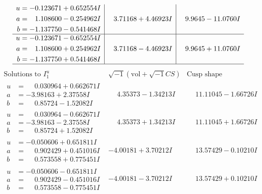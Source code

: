 \documentclass[1p]{elsarticle_modified}
\theoremstyle{definition}
\newcommand{\I}{\sqrt{-1}}
\begin{document}
$$\begin{array}{c|c|c}
\begin{aligned}
u &= -0.123671 + 0.652554 I \\
a &= \phantom{-}1.108600 - 0.254962 I \\
b &= -1.137750 - 0.541468 I\end{aligned}
 & \phantom{-}3.71168 + 4.46923 I & \phantom{-}9.9645 - 11.0760 I \\ \hline\begin{aligned}
u &= -0.123671 - 0.652554 I \\
a &= \phantom{-}1.108600 + 0.254962 I \\
b &= -1.137750 + 0.541468 I\end{aligned}
 & \phantom{-}3.71168 - 4.46923 I & \phantom{-}9.9645 + 11.0760 I\\
 \hline 
 \end{array}$$\newpage$$\begin{array}{c|c|c}  
\text{Solutions to }I^u_{1}& \I (\text{vol} + \sqrt{-1}CS) & \text{Cusp shape}\\
 \hline 
\begin{aligned}
u &= \phantom{-}0.030964 + 0.662671 I \\
a &= -3.98163 + 2.37558 I \\
b &= \phantom{-}0.85724 - 1.52082 I\end{aligned}
 & \phantom{-}4.35373 - 1.34213 I & \phantom{-}11.11045 - 1.66726 I \\ \hline\begin{aligned}
u &= \phantom{-}0.030964 - 0.662671 I \\
a &= -3.98163 - 2.37558 I \\
b &= \phantom{-}0.85724 + 1.52082 I\end{aligned}
 & \phantom{-}4.35373 + 1.34213 I & \phantom{-}11.11045 + 1.66726 I \\ \hline\begin{aligned}
u &= -0.050606 + 0.651811 I \\
a &= \phantom{-}0.902429 + 0.451016 I \\
b &= \phantom{-}0.573558 + 0.775451 I\end{aligned}
 & -4.00181 + 3.70212 I & \phantom{-}13.57429 - 0.10210 I \\ \hline\begin{aligned}
u &= -0.050606 - 0.651811 I \\
a &= \phantom{-}0.902429 - 0.451016 I \\
b &= \phantom{-}0.573558 - 0.775451 I\end{aligned}
 & -4.00181 - 3.70212 I & \phantom{-}13.57429 + 0.10210 I \\ \hline\begin{aligned}

\end{aligned}
\end{array}$$
\end{document}
